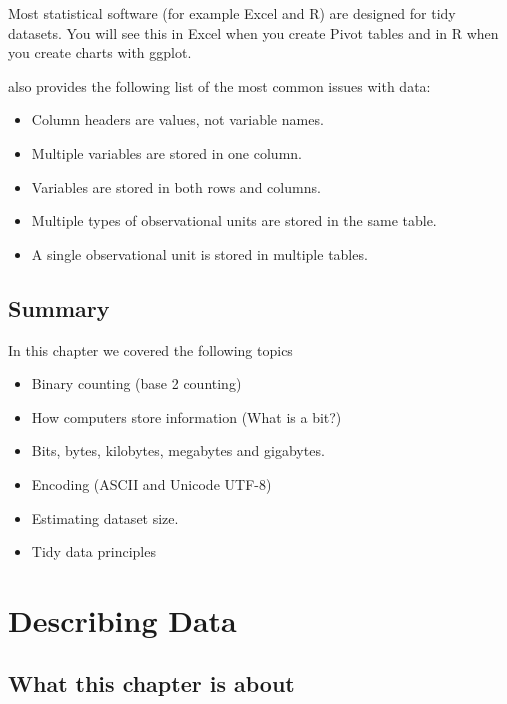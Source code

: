 \documentclass[
]{book}
\providecommand{\tightlist}{%
  \setlength{\itemsep}{0pt}\setlength{\parskip}{0pt}}
\begin{document}
Most statistical software (for example Excel and R) are designed for tidy datasets. You will see this in Excel when you create Pivot tables and in R when you create charts with ggplot.

\citep{wickham2014tidy} also provides the following list of the most common issues with data:

\begin{itemize}
\tightlist
\item
  Column headers are values, not variable names.
\item
  Multiple variables are stored in one column.
\item
  Variables are stored in both rows and columns.
\item
  Multiple types of observational units are stored in the same table.
\item
  A single observational unit is stored in multiple tables.
\end{itemize}

\hypertarget{summary-1}{%
\section{Summary}\label{summary-1}}

In this chapter we covered the following topics

\begin{itemize}
\tightlist
\item
  Binary counting (base 2 counting)
\item
  How computers store information (What is a bit?)
\item
  Bits, bytes, kilobytes, megabytes and gigabytes.
\item
  Encoding (ASCII and Unicode UTF-8)
\item
  Estimating dataset size.
\item
  Tidy data principles
\end{itemize}

\hypertarget{describing-data}{%
\chapter{Describing Data}\label{describing-data}}

\hypertarget{what-this-chapter-is-about-8}{%
\section{What this chapter is about}\label{what-this-chapter-is-about-8}}
\end{document}
